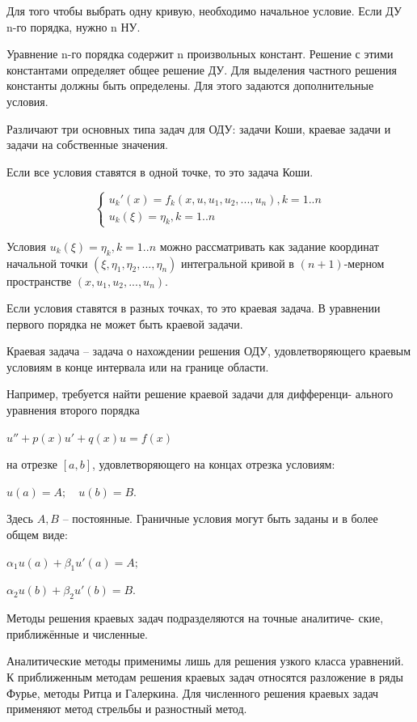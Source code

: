 \documentclass[a4paper,14pt]{article}
\begin{document}
Для того чтобы выбрать одну кривую, необходимо начальное условие. Если ДУ n-го
порядка, нужно n НУ. 

Уравнение n-го порядка содержит n произвольных констант. Решение с этими
константами определяет общее решение ДУ. Для выделения частного решения
константы должны быть определены. Для этого задаются дополнительные условия.

Различают три основных типа задач для ОДУ: задачи Коши, краевае задачи
и задачи на собственные значения.

Если все условия ставятся в одной точке, то это задача Коши.

\begin{equation*}
	\begin{cases}
		u_k'(x) = f_k(x, u, u_1, u_2, ..., u_n), k = 1..n \\
		u_k(\xi) = \eta_k, k = 1..n
	\end{cases}
\end{equation*}

Условия $u_k(\xi) = \eta_k, k = 1..n$ можно рассматривать как задание координат 
начальной точки $(\xi, \eta_1, \eta_2, ..., \eta_n)$ интегральной кривой в 
$(n + 1)$-мерном пространстве $(x, u_1, u_2, ..., u_n)$.

Если условия ставятся в разных точках, то это краевая задача. В уравнении первого порядка
не может быть краевой задачи.

Краевая задача -- задача о нахождении решения ОДУ, 
удовлетворяющего краевым условиям в конце интервала или
на границе области.

Например, требуется найти решение краевой задачи для дифференци-
ального уравнения второго порядка

$u'' + p(x) u' + q(x) u = f(x)$

на отрезке $[a, b]$, удовлетворяющего на концах отрезка условиям:

$u(a) = A; \, \, \, \, \, \, u(b) = B$.

Здесь $A, B$ -- постоянные. Граничные условия могут быть заданы и в более
общем виде:

$\alpha_1 u(a) + \beta_1 u'(a) = A;$

$\alpha_2 u(b) + \beta_2 u'(b) = B.$

Методы решения краевых задач подразделяются на точные аналитиче-
ские, приближённые и численные.

Аналитические методы применимы лишь для решения узкого класса уравнений. 
К приближенным методам решения краевых задач относятся разложение в ряды Фурье,
методы Ритца и Галеркина. Для численного решения краевых задач применяют
метод стрельбы и разностный метод.
\end{document}
